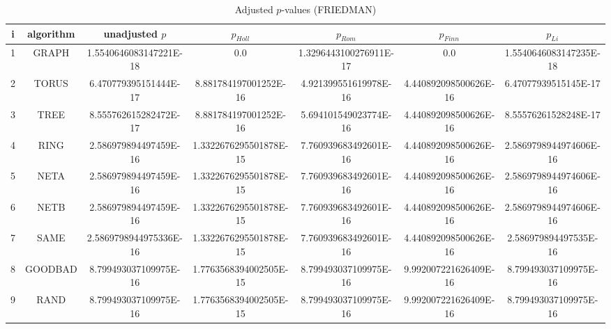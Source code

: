 \documentclass[a4paper,10pt]{article}
\begin{document}
\begin{landscape}
\begin{table}[!htp]
\centering\scriptsize
\caption{Adjusted $p$-values (FRIEDMAN)}
\begin{tabular}{ccccccc}
i&algorithm&unadjusted $p$&$p_{Holl}$&$p_{Rom}$&$p_{Finn}$&$p_{Li}$\\
\hline
1& GRAPH&1.5540646083147221E-18&0.0&1.3296443100276911E-17&0.0&1.5540646083147235E-18\\
2& TORUS&6.470779395151444E-17&8.881784197001252E-16&4.921399551619978E-16&4.440892098500626E-16&6.47077939515145E-17\\
3& TREE&8.555762615282472E-17&8.881784197001252E-16&5.694101549023774E-16&4.440892098500626E-16&8.55576261528248E-17\\
4& RING&2.586979894497459E-16&1.3322676295501878E-15&7.760939683492601E-16&4.440892098500626E-16&2.5869798944974606E-16\\
5& NETA&2.586979894497459E-16&1.3322676295501878E-15&7.760939683492601E-16&4.440892098500626E-16&2.5869798944974606E-16\\
6& NETB&2.586979894497459E-16&1.3322676295501878E-15&7.760939683492601E-16&4.440892098500626E-16&2.5869798944974606E-16\\
7& SAME&2.5869798944975336E-16&1.3322676295501878E-15&7.760939683492601E-16&4.440892098500626E-16&2.586979894497535E-16\\
8& GOODBAD&8.799493037109975E-16&1.7763568394002505E-15&8.799493037109975E-16&9.992007221626409E-16&8.799493037109975E-16\\
9& RAND&8.799493037109975E-16&1.7763568394002505E-15&8.799493037109975E-16&9.992007221626409E-16&8.799493037109975E-16\\
\hline
\end{tabular}
\end{table}


\newpage


\end{landscape}
\end{document}
